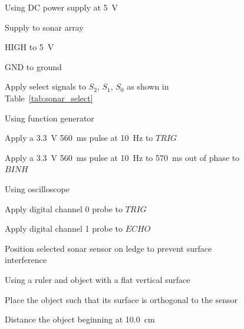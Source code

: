 \documentclass{article}
\begin{document}
    \begin{figure}[htb]
        \centering
        \begin{framed}
        \begin{enumerate*}
            \item Using DC power supply at \SI{5}{\volt}
            \begin{enumerate*}
                \item Supply to sonar array
                \begin{enumerate*}
                    \item HIGH to \SI{5}{\volt}
                    \item GND to ground
                \end{enumerate*}
                \item Apply select signals to $S_2$, $S_1$, $S_0$
                as shown in Table~\ref{tab:sonar_select}
            \end{enumerate*}
            \item Using function generator
            \begin{enumerate*}
                \item Apply a \SI{3.3}{\volt} \SI{560}{\milli\second} pulse
                at \SI{10}{\hertz} to $TRIG$
                \item Apply a \SI{3.3}{\volt} \SI{560}{\milli\second} pulse
                at \SI{10}{\hertz} to \SI{570}{\milli\second} out of phase to $BINH$
            \end{enumerate*}
            \item Using oscilloscope
            \begin{enumerate*}
                \item Apply digital channel 0 probe to $TRIG$
                \item Apply digital channel 1 probe to $ECHO$
            \end{enumerate*}
            \item Position selected sonar sensor on ledge
            to prevent surface interference
            \item Using a ruler and object with a flat vertical surface
            \begin{enumerate*}
                \item Place the object such that its surface is orthogonal
                to the sensor
                \item Distance the object beginning at \SI{10.0}{\centi\meter}

\end{enumerate*}
\end{enumerate*}
\end{framed}
\end{figure}
\end{document}
